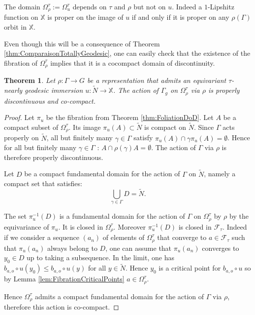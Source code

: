 \documentclass[reqno,10pt]{amsart}
\theoremstyle{plain}
\newtheorem{thm}{Theorem}[section]
\theoremstyle{definition}
\theoremstyle{remark}
\newcommand{\type}{\tau}
\newcommand{\X}{\mathbb{X}}
\newcommand{\ie}{namely }
\begin{document}
\medskip

 The domain $\Omega^\type_\rho:=\Omega^\type_u$ depends on $\type$ and $\rho$ but not on $u$. Indeed a $1$-Lipshitz function on $\X$ is proper on the image of $u$ if and only if it is proper on any $\rho(\Gamma)$ orbit in $\X$. 
 
 
 \medskip
 
 Even though this will be a consequence of Theorem \ref{thm:ComparaisonTotallyGeodesic}, one can easily check that the existence of the fibration of $\Omega^\type_\rho$ implies that it is a cocompact domain of discontinuity.

\begin{thm}
\label{thm:DoD}
Let $\rho:\Gamma\to G$ be a representation that admits an equivariant $\type$-nearly geodesic immersion $u:\widetilde{N}\to \X$. The action of $\Gamma_g$ on $\Omega_\rho^\type$ via $\rho$ is properly discontinuous and co-compact.
\end{thm}

\begin{proof}

Let $\pi_u$ be the fibration from Theorem \ref{thm:FoliationDoD}. Let $A$ be a compact subset of $\Omega^\type_\rho$. Its image $\pi_u(A)\subset \widetilde{N}$ is compact on $\widetilde{N}$. Since $\Gamma$ acts properly on $\widetilde{N}$, all but finitely many $\gamma\in \Gamma$ satisfy $\pi_u(A)\cap \gamma \pi_u(A)=\emptyset$. Hence for all but finitely many $\gamma\in \Gamma$ : $A\cap \rho(\gamma) A=\emptyset$. The action of $\Gamma$ via $\rho$ is therefore properly discontinuous.

\medskip

Let $D$ be a compact fundamental domain for the action of $\Gamma$ on $\widetilde{N}$, \ie a compact set that satisfies:
$$\bigcup_{\gamma\in \Gamma}D=\widetilde{N}. $$ 

The set $\pi_u^{-1}(D)$ is a fundamental domain for the action of $\Gamma$ on $\Omega^\type_\rho$ by $\rho$ by the equivariance of $\pi_u$. It is closed in $\Omega^\type_\rho$.
Moreover $\pi_u^{-1}(D)$ is closed in $\mathcal{F}_\type$. Indeed if we consider a sequence $(a_n)$ of elements of $\Omega^\type_\rho$ that converge to $a\in \mathcal{F}_\type$ such that $\pi_u(a_n)$ always belong to $D$, one can assume that $\pi_u(a_n)$ converges to $y_0\in D$ up to taking a subsequence. In the limit, one has $b_{a,o}\circ u(y_0)\leq b_{a,o}\circ u(y)$ for all $y\in \widetilde{N}$. Hence $y_0$ is a critical point for $b_{a,o}\circ u$ so by Lemma \ref{lem:FibrationCriticalPoints} $a\in \Omega^\type_\rho$.
 
 \medskip

Hence $\Omega^\type_\rho$ admits a compact fundamental domain for the action of $\Gamma$ via $\rho$, therefore this action is co-compact.

\end{proof}
\end{document}
